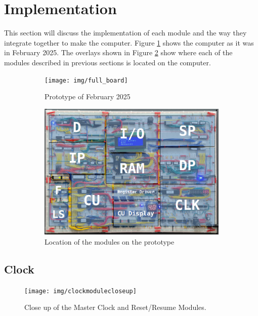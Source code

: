 \section{Implementation} \label{sec:implementation}
This section will discuss the implementation of each module and the way they integrate together to make the computer. Figure \ref{fig:prototypea} shows the computer as it was in February 2025. The overlays shown in Figure \ref{fig:prototypeb} show where each of the modules described in previous sections is located on the computer.

\begin{figure}[H]
  \centering
  \begin{subfigure}{0.9\linewidth}
    \centering
    \texttt{[image: img/full\_board]}
    \caption{Prototype of February 2025}
    \label{fig:prototypea}
  \end{subfigure}
  \vspace{\baselineskip}
  \begin{subfigure}{0.9\linewidth}
    \centering
    \includegraphics[width=0.8\linewidth]{img/computerparts}
    \caption{Location of the modules on the prototype}
    \label{fig:prototypeb}
  \end{subfigure}
  \caption{}
  \label{fig:prototype}
\end{figure}


\subsection{Clock} \label{sec:clock}
\begin{figure}[H]
  \centering
  \texttt{[image: img/clockmodulecloseup]}
  \caption{Close up of the Master Clock and Reset/Resume Modules.}
  \label{fig:masterclockcloseup}
\end{figure}

